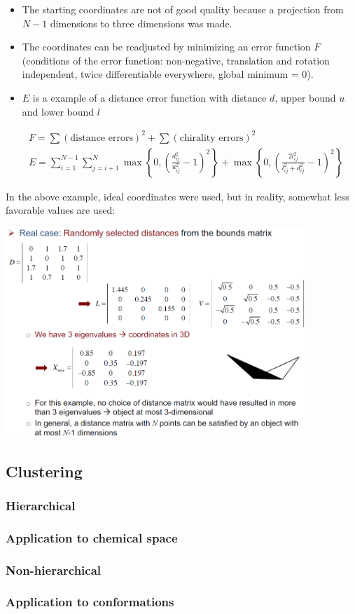 \begin{enumerate}
\begin{itemize}
        \item The starting coordinates are not of good quality because a projection from $N-1$ dimensions to three dimensions was made.
        \item The coordinates can be readjusted by minimizing an error function $F$ (conditions of the error function: non-negative, translation and rotation independent, twice differentiable everywhere, global minimum = 0). 
        \item $E$ is a example of a distance error function with distance $d$, upper bound $u$ and lower bound $l$
    \end{itemize}
    \begin{align}
        &F=\sum(\text{distance errors})^2+\sum(\text{chirality errors})^2\\&E=\sum_{i=1}^{N-1}\sum_{j=i+1}^{N}\max\left\{0,\left(\frac{d_{ij}^2}{u_{ij}^2}-1\right)^2\right\}+\max\left\{0,\left(\frac{2l_{ij}^2}{l_{ij}^2+d_{ij}^2}-1\right)^2\right\}
    \end{align}
\end{enumerate}

In the above example, ideal coordinates were used, but in reality, somewhat less favorable values are used:

\begin{center}\includegraphics[width=0.85\textwidth]{img/cheminformatics/3dRealCase.png}\end{center}

\subsection{Clustering}

\subsubsection{Hierarchical}

\subsubsection{Application to chemical space}

\subsubsection{Non-hierarchical}

\subsubsection{Application to conformations}